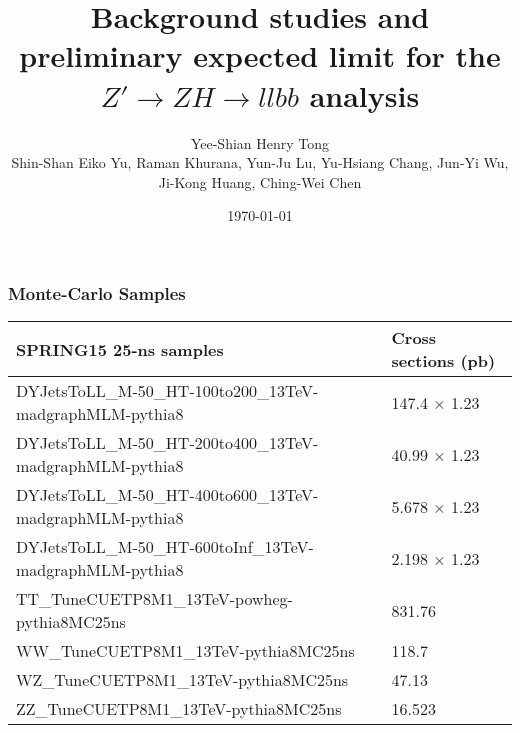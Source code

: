 \documentclass[7pt,aspectratio=1610]{beamer}
\title[]{\LARGE{Background studies and preliminary expected limit for the $Z' \rightarrow ZH \rightarrow llbb$ analysis}} %
\author[Henry Tong]{\Large{Yee-Shian Henry Tong}\\[3mm] \scriptsize{Shin-Shan Eiko Yu, Raman Khurana, Yun-Ju Lu, Yu-Hsiang Chang, Jun-Yi Wu, Ji-Kong Huang, Ching-Wei Chen}} %
\institute[NCU]{ %
  National Central University \\ %
  \medskip
  \textit{Dibosons Resonance Meeting}
}
\date{\today} %
\renewcommand{\arraystretch}{1.2}
\begin{document}
\begin{frame}
  \vspace*{-1cm}
  \enlargethispage{1cm}
  \titlepage %
\end{frame}



\everymath{\displaystyle}
\renewcommand{\arraystretch}{1.25}

\begin{frame}
  \frametitle{Monte-Carlo Samples}
  \justifying 
  \begin{tiny}
    \begin{center}
      \begin{tabular}{ | l | l | }
        \hline
        \bf SPRING15 25-ns samples & \bf Cross sections (pb) \\
        \hline
        DYJetsToLL\_M-50\_HT-100to200\_13TeV-madgraphMLM-pythia8
        & 147.4 $\times$ 1.23  \\
        \hline
        DYJetsToLL\_M-50\_HT-200to400\_13TeV-madgraphMLM-pythia8
        & 40.99 $\times$ 1.23  \\
        \hline
        DYJetsToLL\_M-50\_HT-400to600\_13TeV-madgraphMLM-pythia8
        & 5.678 $\times$ 1.23  \\
        \hline
        DYJetsToLL\_M-50\_HT-600toInf\_13TeV-madgraphMLM-pythia8
        & 2.198 $\times$ 1.23   \\
        \hline  
        TT\_TuneCUETP8M1\_13TeV-powheg-pythia8MC25ns
        & 831.76      \\
        \hline
        WW\_TuneCUETP8M1\_13TeV-pythia8MC25ns 
        & 118.7       \\
        \hline
        WZ\_TuneCUETP8M1\_13TeV-pythia8MC25ns 
        & 47.13       \\
        \hline
        ZZ\_TuneCUETP8M1\_13TeV-pythia8MC25ns 
        & 16.523      \\
        \hline
      \end{tabular}
    \end{center}
  \end{tiny}
\end{frame}
\end{document}
